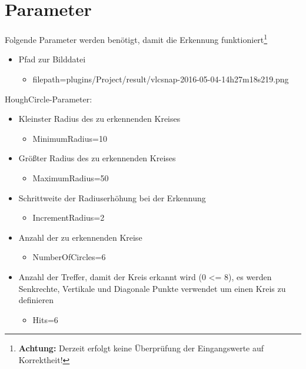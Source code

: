\section{Parameter}
Folgende Parameter werden benötigt, damit die Erkennung funktioniert\footnote{\textbf{Achtung:} Derzeit erfolgt keine Überprüfung der Eingangswerte auf Korrektheit!}
\begin{itemize}
	\item Pfad zur Bilddatei
	\begin{itemize}
		\item filepath=plugins/Project/result/vlcsnap-2016-05-04-14h27m18s219.png
	\end{itemize}
	\end{itemize}
HoughCircle-Parameter:
\begin{itemize}
	\item Kleinster Radius des zu erkennenden Kreises
	\begin{itemize}
		 \item MinimumRadius=10
	\end{itemize}
	\item Größter Radius des zu erkennenden Kreises
	\begin{itemize}
		\item MaximumRadius=50
	\end{itemize}
	\item Schrittweite der Radiuserhöhung bei der Erkennung
	\begin{itemize}
		\item IncrementRadius=2
	\end{itemize}
	\item Anzahl der zu erkennenden Kreise
	\begin{itemize}
		\item NumberOfCircles=6
	\end{itemize}
	\item Anzahl der Treffer, damit der Kreis erkannt wird (0 <= 8), es werden Senkrechte, Vertikale und Diagonale Punkte verwendet um einen Kreis zu definieren
	\begin{itemize}
		\item Hits=6
	\end{itemize}
\end{itemize}
